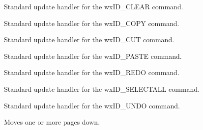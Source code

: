 
Standard update handler for the wxID\_CLEAR command.

\label{wxrichtextctrlonupdatecopy}


Standard update handler for the wxID\_COPY command.

\label{wxrichtextctrlonupdatecut}


Standard update handler for the wxID\_CUT command.

\label{wxrichtextctrlonupdatepaste}


Standard update handler for the wxID\_PASTE command.

\label{wxrichtextctrlonupdateredo}


Standard update handler for the wxID\_REDO command.

\label{wxrichtextctrlonupdateselectall}


Standard update handler for the wxID\_SELECTALL command.

\label{wxrichtextctrlonupdateundo}


Standard update handler for the wxID\_UNDO command.

\label{wxrichtextctrlpagedown}


Moves one or more pages down.

\label{wxrichtextctrlpageup}


